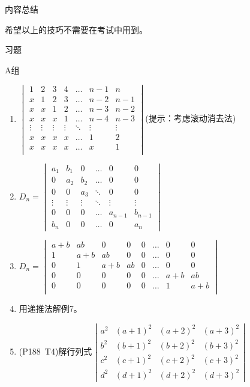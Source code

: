 \centerline{\heiti \Large 内容总结}

希望以上的技巧不需要在考试中用到。

\centerline{\heiti \Large 习题}
\vspace{2ex}
{\kaishu }
\begin{flushright}
    \kaishu

\end{flushright}
\centerline{\heiti A组}
\begin{enumerate}
    \item $
    \begin{vmatrix}
    1&2&3&4&\ldots&n-1&n\\
    x&1&2&3&\ldots&n-2&n-1\\
    x&x&1&2&\ldots&n-3&n-2\\
    x&x&x&1&\ldots&n-4&n-3\\
    \vdots&\vdots&\vdots&\vdots&\ddots&\vdots&\vdots\\
    x&x&x&x&\ldots&1&2\\
    x&x&x&x&\ldots&x&1\\
    \end{vmatrix}$(提示：考虑滚动消去法)
    \item $
    D_n=\begin{vmatrix}
    a_1&b_1&0&\ldots&0&0\\
    0&a_2&b_2&\ldots&0&0\\
    0&0&a_3&\ddots&0&0\\
    \vdots&\vdots&\vdots&\ddots&\vdots&\vdots\\
    0&0&0&\ldots&a_{n-1}&b_{n-1}\\
    b_n&0&0&\ldots&0&a_n
    \end{vmatrix}$
    \item $D_n=\begin{vmatrix}
    a+b&ab&0&0&0&\ldots&0&0\\
    1&a+b&ab&0&0&\ldots&0&0\\
    0&1&a+b&ab&0&\ldots&0&0\\
    0&0&0&0&0&\ldots&a+b&ab\\
    0&0&0&0&0&\ldots&1&a+b\\
    \end{vmatrix}$
    \item 用递推法解例7。
    \item (P188\ T4)解行列式
    $
    \left|\begin{array}{llll}
    a^{2} & (a+1)^{2} & (a+2)^{2} & (a+3)^{2} \\
    b^{2} & (b+1)^{2} & (b+2)^{2} & (b+3)^{2} \\
    c^{2} & (c+1)^{2} & (c+2)^{2} & (c+3)^{2} \\
    d^{2} & (d+1)^{2} & (d+2)^{2} & (d+3)^{2}
    \end{array}\right|
    $
    

\end{enumerate}

